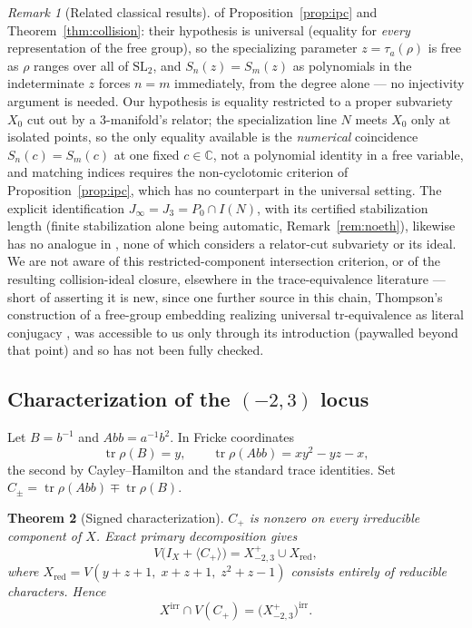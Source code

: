 \documentclass[11pt,a4paper]{article}
\newtheorem{theorem}{Theorem}[section]
\theoremstyle{definition}
\theoremstyle{remark}
\newtheorem{remark}[theorem]{Remark}
\newcommand{\tr}{\operatorname{tr}}
\begin{document}
\begin{remark}[Related classical results]
of Proposition~\ref{prop:ipc} and Theorem~\ref{thm:collision}: their
hypothesis is universal (equality for \emph{every} representation of the
free group), so the specializing parameter $z=\tau_a(\rho)$ is free as
$\rho$ ranges over all of $\mathrm{SL}_2$, and $S_n(z)=S_m(z)$ as
polynomials in the indeterminate $z$ forces $n=m$ immediately, from the
degree alone --- no injectivity argument is needed. Our hypothesis is
equality restricted to a proper subvariety $X_0$ cut out by a
$3$-manifold's relator; the specialization line $N$ meets $X_0$ only at
isolated points, so the only equality available is the \emph{numerical}
coincidence $S_n(c)=S_m(c)$ at one fixed $c\in\mathbb C$, not a polynomial
identity in a free variable, and matching indices requires the
non-cyclotomic criterion of Proposition~\ref{prop:ipc}, which has no
counterpart in the universal setting. The explicit identification
$J_\infty=J_3=P_0\cap I(N)$, with its certified stabilization length
(finite stabilization alone being automatic, Remark~\ref{rem:noeth}),
likewise has no analogue in
\cite{Horowitz1972,Southcott1979,GinzburgRudnick1998,Wang2007}, none of
which considers a relator-cut subvariety or its ideal. We are not aware
of this restricted-component intersection criterion, or of the resulting
collision-ideal closure, elsewhere in the trace-equivalence literature ---
short of asserting it is new, since one further source in this chain,
Thompson's construction of a free-group embedding realizing universal
tr-equivalence as literal conjugacy \cite{Thompson1989}, was accessible to
us only through its introduction (paywalled beyond that point) and so has
not been fully checked.
\end{remark}

\subsection{Characterization of the $(-2,3)$ locus}

Let $B = b^{-1}$ and $Abb = a^{-1}b^2$. In Fricke coordinates
\begin{equation}
\tr\rho(B) = y, \qquad
\tr\rho(Abb) = xy^2 - yz - x,
\end{equation}
the second by Cayley--Hamilton and the standard trace identities.
Set $C_\pm = \tr\rho(Abb) \mp \tr\rho(B)$.

\begin{theorem}[Signed characterization]
\label{thm:signed}
$C_+$ is nonzero on every irreducible component of $X$. Exact primary
decomposition gives
\begin{equation}
V\bigl(I_X + \langle C_+ \rangle\bigr)
= X^{+}_{-2,3} \cup X_{\mathrm{red}},
\end{equation}
where $X_{\mathrm{red}} = V(y+z+1,\; x+z+1,\; z^2+z-1)$ consists
entirely of reducible characters. Hence
\begin{equation}
X^{\mathrm{irr}} \cap V(C_+) = \bigl(X^{+}_{-2,3}\bigr)^{\mathrm{irr}} .
\end{equation}
\end{theorem}
\end{document}
